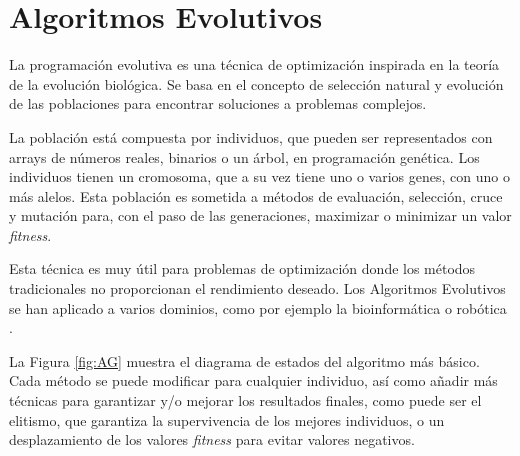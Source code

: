 		\newpage

		
		









\section{Algoritmos Evolutivos}


	La programación evolutiva es una técnica de optimización inspirada en la teoría de la evolución biológica. Se basa en el concepto de selección natural y evolución de las poblaciones para encontrar soluciones a problemas complejos. 
	
	La población está compuesta por individuos, que pueden ser representados con arrays de números reales, binarios o un árbol, en programación genética. Los individuos tienen un cromosoma, que a su vez tiene uno o varios genes, con uno o más alelos. Esta población es sometida a métodos de evaluación, selección, cruce y mutación para, con el paso de las generaciones, maximizar o minimizar un valor \textit{fitness}.
	
	Esta técnica es muy útil para problemas de optimización donde los métodos tradicionales no proporcionan el rendimiento deseado. Los Algoritmos Evolutivos se han aplicado a varios dominios, como por ejemplo la bioinformática o robótica \cite{contreras2015mobile}.
	
	La Figura \ref{fig:AG} muestra el diagrama de estados del algoritmo más básico. Cada método se puede modificar para cualquier individuo, así como añadir más técnicas para garantizar y/o mejorar los resultados finales, como puede ser el elitismo, que garantiza la supervivencia de los mejores individuos, o un desplazamiento de los valores \textit{fitness} para evitar valores negativos. 


